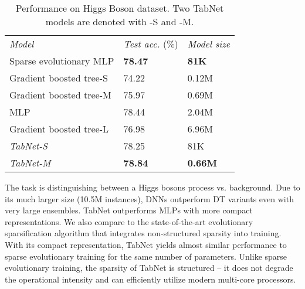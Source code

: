 \begin{table}[h!]
\vspace{0cm}
\caption{Performance on Higgs Boson dataset. Two TabNet models are denoted with -S and -M.}
\vspace{0cm}
\centering
\begin{tabular}{|C{3.6 cm}|C{1.8 cm}|C{1.6 cm}|}
    \textit{Model} & \textit{Test acc.} (\%)  & \textit{Model size}       \\ 
    Sparse evolutionary MLP  & \textbf{78.47}  &   \textbf{81K}     \\ 
    Gradient boosted tree-S  & 74.22   &  0.12M      \\ 
    Gradient boosted tree-M  & 75.97   &     0.69M   \\ 
    MLP   &  78.44 &  2.04M  \\ 
    Gradient boosted tree-L  &  76.98  &    6.96M    \\ \hhline{|=|=|=|}
    \textit{TabNet-S}  &  78.25 & 81K \\ 
    \textit{TabNet-M}  &  \textbf{78.84} & \textbf{0.66M} \\ 
\end{tabular}
\label{table:higgs}
\vspace{0cm}
\end{table}

\vspace{0cm}
\noindent{} The task is distinguishing between a Higgs bosons process vs. background. 
Due to its much larger size (10.5M instances), DNNs outperform DT variants even with very large ensembles. 
TabNet outperforms MLPs with more compact representations. 
We also compare to the state-of-the-art evolutionary sparsification algorithm \citep{sparse_mlp} that integrates non-structured sparsity into training.
With its compact representation, TabNet yields almost similar performance to sparse evolutionary training for the same number of parameters.
Unlike sparse evolutionary training, the sparsity of TabNet is structured -- it does not degrade the operational intensity \citep{structured_sparsity} and can efficiently utilize modern multi-core processors.

